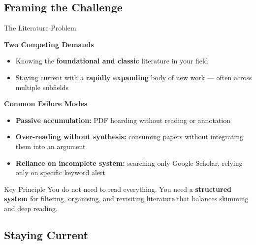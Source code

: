 \documentclass{beamer}
\begin{document}


\begin{frame}
  \tableofcontents
\end{frame}
\subsection{Framing the Challenge}
\begin{frame}{The Literature Problem}

  \footnotesize
  \textbf{Two Competing Demands}
  \begin{itemize}
    \item Knowing the \textbf{foundational and classic} literature
      in your field
    \item Staying current with a \textbf{rapidly expanding} body
      of new work --- often across multiple subfields
  \end{itemize}

  \medskip
  \textbf{Common Failure Modes}
  \begin{itemize}
    \item \textbf{Passive accumulation:} PDF hoarding without
      reading or annotation
    \item \textbf{Over-reading without synthesis:} consuming
      papers without integrating them into an argument
    \item \textbf{Reliance on incomplete system:} searching
      only Google Scholar, relying only on specific keyword alert
  \end{itemize}

  \medskip
  \begin{block}{Key Principle}
    You do not need to read everything.
    You need a \textbf{structured system} for filtering,
    organising, and revisiting literature that balances skimming
    and deep reading.
  \end{block}

\end{frame}


\subsection{Staying Current}
\end{document}

